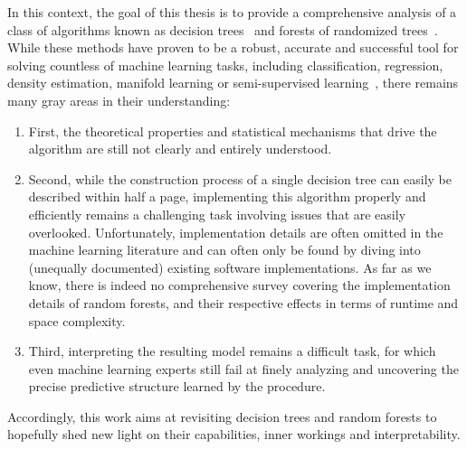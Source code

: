 In this context, the goal of this thesis is to provide a comprehensive analysis
of a class of algorithms known as decision trees~\citep{breiman:1984} and
forests of randomized trees~\citep{breiman:2001,geurts:2006}. While these
methods have proven to be a robust, accurate and successful tool for solving
countless of machine learning tasks, including classification, regression,
density estimation, manifold learning or semi-supervised
learning~\citep{criminisi:2011}, there remains many gray areas in their
understanding:
\begin{enumerate}
\item First, the theoretical properties and statistical mechanisms
that drive the algorithm are still not clearly and entirely understood.
\item Second, while the construction process of a single decision tree can
easily be described within half a page, implementing this algorithm properly
and efficiently remains a challenging task involving issues that are easily
overlooked. Unfortunately, implementation details are often omitted in the
machine learning literature and can often only be found by diving into
(unequally documented) existing software implementations. As far as we know,
there is indeed no comprehensive survey covering the implementation details of
random forests, and their respective effects in terms of runtime and space
complexity.
\item Third, interpreting the resulting model remains a difficult task,
for which even machine learning experts still fail at finely analyzing and
uncovering the precise predictive structure learned by the procedure.
\end{enumerate}
Accordingly, this work aims at revisiting decision trees and random forests to
hopefully shed new light on their capabilities, inner workings and
interpretability.

